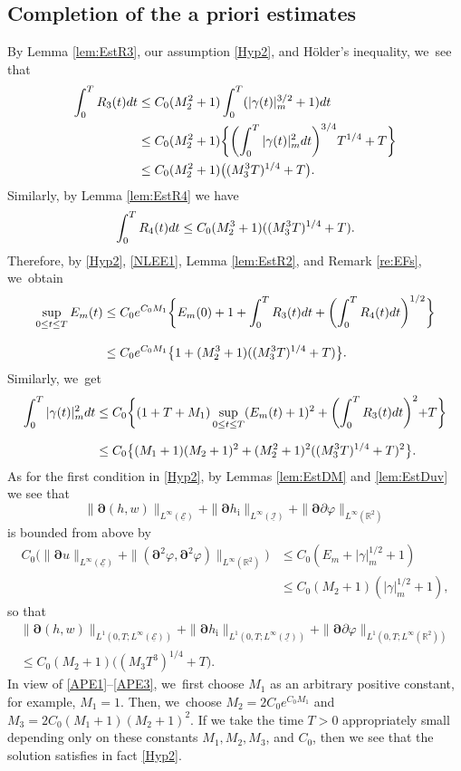 \documentclass[11pt]{article}
\newcommand{\R}{{\mathbb R}}
\newcommand{\cI}{{\mathcal I}}
\newcommand{\cE}{{\mathcal E}}
\newcommand{\ul}[1]{\underline{#1}}
\theoremstyle{definition}
\begin{document}
\subsection{Completion of the a priori estimates}\label{sectAPE}
By Lemma \ref{lem:EstR3}, our assumption \eqref{Hyp2}, and Hölder's inequality, we~see that
\begin{align*}
\int_0^TR_3(t){\rm d}t
&\leq C_0(M_2^2+1)\int_0^T(|\gamma(t)|_m^{3/2}+1){\rm d}t \\
&\leq C_0(M_2^2+1)\biggl\{ \biggl(\int_0^T|\gamma(t)|_m^2{\rm d}t\biggr)^{3/4}T^{1/4} + T \biggl\} \\
&\leq C_0(M_2^2+1)\bigl((M_3^3T)^{1/4}+T\bigr).
\end{align*}
Similarly, by Lemma \ref{lem:EstR4} we have
\[
\int_0^TR_4(t){\rm d}t \leq C_0(M_2^3+1)((M_3^3T)^{1/4}+T).
\]
Therefore, by \eqref{Hyp2}, \eqref{NLEE1}, Lemma \ref{lem:EstR2}, and Remark \ref{re:EFs}, we~obtain
\begin{align}\label{APE1}
\sup_{0\leq t\leq T}E_m(t)
&\leq C_0 e^{C_0M_1}\biggl\{ E_m(0) + 1 + \int_0^TR_3(t){\rm d}t + \biggl(\int_0^TR_4(t){\rm d}t \biggr)^{1/2} \biggr\} \notag\\[-3pt] &\\[-5pt]
&\leq C_0 e^{C_0M_1}\bigl\{ 1 + (M_2^3+1)((M_3^3T)^{1/4}+T) \bigr\}.\notag
\end{align}
Similarly, we~get
\begin{align}\label{APE2}
\int_0^T|\gamma(t)|_m^2{\rm d}t
&\leq C_0 \biggl\{ (1+T+M_1)\sup_{0\leq t\leq T}(E_m(t)+1)^2 + \biggl(\int_0^TR_3(t){\rm d}t \biggl)^2 + T \biggr\}\notag \\ &\\[-10pt]
&\leq C_0 \bigl\{ (M_1+1)(M_2+1)^2 + (M_2^2+1)^2 ((M_3^3T)^{1/4}+T)^2 \bigr\}.\notag
\end{align}
As for the first condition in \eqref{Hyp2}, by Lemmas \ref{lem:EstDM} and \ref{lem:EstDuv} we see that
\[
\|\bm{\partial}(h,w)\|_{L^\infty(\ul{\cE})} + \|\bm{\partial} h_\mathrm{i}\|_{L^\infty(\ul{\cI})} + \|\bm{\partial}\partial\varphi\|_{L^\infty(\R^2)}
\]
is bounded from above by
\begin{align*}
C_0 \bigl(\|\bm{\partial}u\|_{L^\infty(\ul{\cE})} + \|(\bm{\partial}^2\varphi,\bm{\partial}^2\varphi)\|_{L^\infty(\R^2)} \bigr)
&\leq C_0 (E_m + |\gamma|_m^{1/2} + 1) \\
&\leq C_0(M_2+1)(|\gamma|_m^{1/2}+1),
\end{align*}
so that
\begin{multline}\label{APE3}
\|\bm{\partial}(h,w)\|_{L^1(0,T;L^\infty(\ul{\cE}))} + \|\bm{\partial} h_\mathrm{i}\|_{L^1(0,T;L^\infty(\ul{\cI}))}
+ \|\bm{\partial}\partial\varphi\|_{L^1(0,T;L^\infty(\R^2))} \\
\leq C_0(M_2+1)\bigl((M_3T^3)^{1/4}+T\bigr).
\end{multline}
In view of \eqref{APE1}--\eqref{APE3}, we~first choose $M_1$ as an arbitrary positive constant, for example, $M_1=1$.
Then, we~choose $M_2=2C_0e^{C_0M_1}$ and $M_3=2C_0(M_1+1)(M_2+1)^2$.
If we take the time $T>0$ appropriately small depending only on these constants $M_1,M_2,M_3$, and $C_0$,
then we see that the solution satisfies in fact \eqref{Hyp2}.
\end{document}
